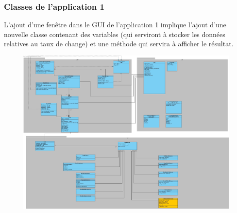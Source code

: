 \documentclass[../rapport.tex]{subfiles}
\begin{document}
\subsubsection{Classes de l'application 1}
L'ajout d'une fenêtre dans le GUI de l'application 1 implique l'ajout d'une nouvelle classe contenant des variables (qui serviront à stocker les données relatives au taux de change) et une méthode qui servira à afficher le résultat.
\begin{figure}[H]
    \includegraphics[scale=0.158]{ressources/photos_diagrammes/extensionUgo/classDiagramApp1.jpg}
\end{figure}
\end{document}
